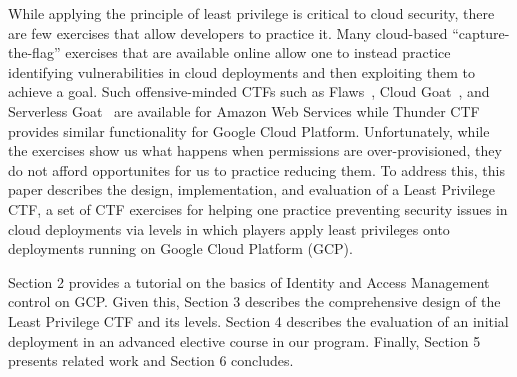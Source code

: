 While applying the principle of least privilege is critical to cloud security, there are
few exercises that allow developers to practice it.  Many cloud-based ``capture-the-flag''
exercises that are available online allow one to instead practice identifying
vulnerabilities in cloud deployments and then exploiting them to achieve a goal. 
Such offensive-minded CTFs such as Flaws~\cite{flaws,flaws2}, Cloud Goat~\cite{cloudgoat},
and Serverless Goat~\cite{serverlessgoat} are available for Amazon Web Services while Thunder CTF~\cite{thunder-ctf} provides similar functionality for Google Cloud Platform.
Unfortunately, while the exercises show us what happens when permissions are over-provisioned,
they do not afford opportunites for us to practice reducing them. To address this, this
paper describes the design, implementation, and evaluation of a Least Privilege CTF, a set of CTF exercises for helping one practice preventing security issues in cloud deployments
via levels in which players apply least privileges onto deployments running on Google Cloud 
Platform (GCP).
 

Section 2 provides a tutorial on the basics of Identity and Access Management control on
GCP. Given this, Section 3 describes the comprehensive design of the Least Privilege CTF and its levels. Section 4 describes the evaluation of an initial deployment in an advanced elective course in our program.  Finally, Section 5 presents related work and Section 6 concludes.